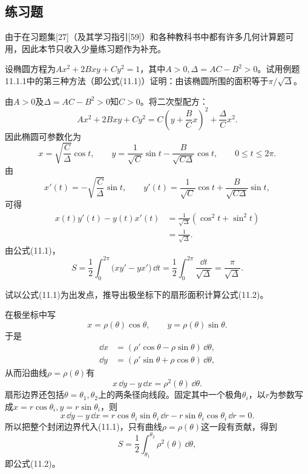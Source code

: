 \subsection{练习题}

由于在习题集[27]（及其学习指引[59]）和各种教科书中都有许多几何计算题可用，因此本节只收入少量练习题作为补充。

\begin{xexercise}[1]
设椭圆方程为$Ax^2+2Bxy+Cy^2=1$，其中$A>0,\Delta=AC-B^2>0$。试用例题11.1.1中的第三种方法（即公式(11.1)）证明：由该椭圆所围的面积等于$\pi/\sqrt\Delta$。
\end{xexercise}
\begin{xsolution}
由$A>0$及$\Delta=AC-B^2>0$知$C>0$。将二次型配方：
\[
 Ax^2+2Bxy+Cy^2
 =C\left(y+\frac BCx\right)^2+\frac{\Delta}{C}x^2.
\]
因此椭圆可参数化为
\[
 x=\sqrt{\frac C\Delta}\cos t,\qquad
 y=\frac1{\sqrt C}\sin t-\frac{B}{\sqrt{C\Delta}}\cos t,\qquad 0\le t\le2\pi.
\]
由
\[
 x'(t)=-\sqrt{\frac C\Delta}\sin t,
 \qquad
 y'(t)=\frac1{\sqrt C}\cos t+
 \frac{B}{\sqrt{C\Delta}}\sin t,
\]
可得
\begin{align*}
x(t)y'(t)-y(t)x'(t)
&=\frac1{\sqrt\Delta}(\cos^2t+\sin^2t)\\
&=\frac1{\sqrt\Delta}.
\end{align*}
由公式(11.1)，
\[
 S=\frac12\int_0^{2\pi}\bigl(xy'-yx'\bigr)\,\dd t
 =\frac12\int_0^{2\pi}\frac{\dd t}{\sqrt\Delta}
 =\frac\pi{\sqrt\Delta}.
\]
\end{xsolution}


\begin{xexercise}[2]
试以公式(11.1)为出发点，推导出极坐标下的扇形面积计算公式(11.2)。
\end{xexercise}
\begin{xsolution}
在极坐标中写
\[
 x=\rho(\theta)\cos\theta,\qquad
 y=\rho(\theta)\sin\theta.
\]
于是
\begin{align*}
\dd x&=(\rho'\cos\theta-\rho\sin\theta)\,\dd\theta,\\
\dd y&=(\rho'\sin\theta+\rho\cos\theta)\,\dd\theta,
\end{align*}
从而沿曲线$\rho=\rho(\theta)$有
\[
 x\,\dd y-y\,\dd x
 =\rho^2(\theta)\,\dd\theta.
\]
扇形边界还包括$\theta=\theta_1,\theta_2$上的两条径向线段。固定其中一个极角$\theta_i$，以$r$为参数写成$x=r\cos\theta_i,y=r\sin\theta_i$，则
\[
 x\,\dd y-y\,\dd x
 =r\cos\theta_i\sin\theta_i\,\dd r-r\sin\theta_i\cos\theta_i\,\dd r=0.
\]
所以把整个封闭边界代入(11.1)，只有曲线$\rho=\rho(\theta)$这一段有贡献，得到
\[
 S=\frac12\int_{\theta_1}^{\theta_2}\rho^2(\theta)\,\dd\theta,
\]
即公式(11.2)。
\end{xsolution}


